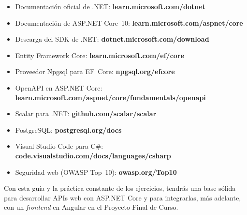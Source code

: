 \documentclass[11pt]{article}
\begin{document}
\begin{itemize}[leftmargin=1.4em,itemsep=2pt,topsep=2pt]
\item Documentación oficial de .NET: \textbf{learn.microsoft.com/dotnet}
\item Documentación de ASP.NET Core~10: \textbf{learn.microsoft.com/aspnet/core}
\item Descarga del SDK de .NET: \textbf{dotnet.microsoft.com/download}
\item Entity Framework Core: \textbf{learn.microsoft.com/ef/core}
\item Proveedor Npgsql para EF~Core: \textbf{npgsql.org/efcore}
\item OpenAPI en ASP.NET Core: \textbf{learn.microsoft.com/aspnet/core/fundamentals/openapi}
\item Scalar para .NET: \textbf{github.com/scalar/scalar}
\item PostgreSQL: \textbf{postgresql.org/docs}
\item Visual Studio Code para C\#: \textbf{code.visualstudio.com/docs/languages/csharp}
\item Seguridad web (OWASP Top~10): \textbf{owasp.org/Top10}
\end{itemize}

Con esta guía y la práctica constante de los ejercicios, tendrás una base sólida para desarrollar APIs web con ASP.NET Core y para integrarlas, más adelante, con un \emph{frontend} en Angular en el Proyecto Final de Curso.
\end{document}
